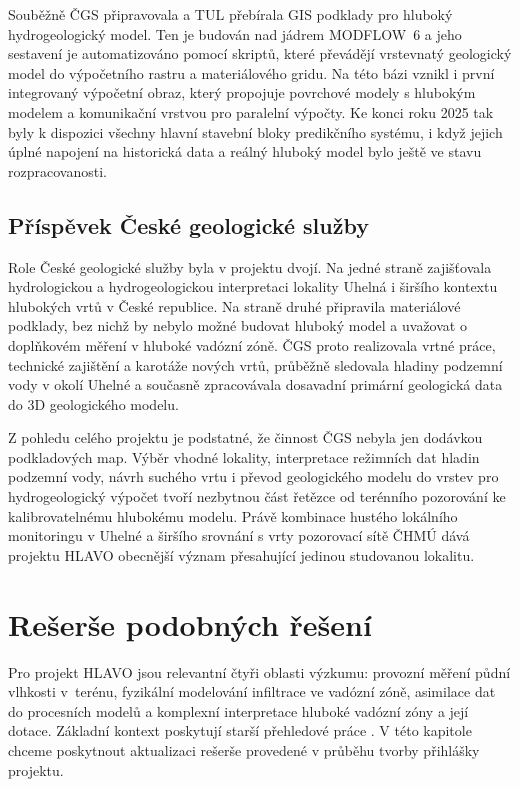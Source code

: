 \documentclass[11pt,a4paper]{article}
\begin{document}
\begin{onehalfspacing}
Souběžně ČGS připravovala a TUL přebírala GIS podklady pro hluboký
hydrogeologický model. Ten je budován nad jádrem MODFLOW~6 a jeho sestavení je
automatizováno pomocí skriptů, které převádějí vrstevnatý geologický model do
výpočetního rastru a materiálového gridu. Na této bázi vznikl i první
integrovaný výpočetní obraz, který propojuje povrchové modely s hlubokým
modelem a komunikační vrstvou pro paralelní výpočty. Ke konci roku 2025 tak
byly k dispozici všechny hlavní stavební bloky predikčního systému, i když
jejich úplné napojení na historická data a reálný hluboký model bylo ještě ve
stavu rozpracovanosti.

\subsection{Příspěvek České geologické služby}
Role České geologické služby byla v projektu dvojí. Na jedné straně
zajišťovala hydrologickou a hydrogeologickou interpretaci lokality Uhelná i
širšího kontextu hlubokých vrtů v České republice. Na straně druhé připravila
materiálové podklady, bez nichž by nebylo možné budovat hluboký model a
uvažovat o doplňkovém měření v hluboké vadózní zóně. ČGS proto realizovala
vrtné práce, technické zajištění a karotáže nových vrtů, průběžně sledovala
hladiny podzemní vody v okolí Uhelné a současně zpracovávala dosavadní
primární geologická data do 3D geologického modelu.

Z pohledu celého projektu je podstatné, že činnost ČGS nebyla jen dodávkou
podkladových map. Výběr vhodné lokality, interpretace režimních dat hladin
podzemní vody, návrh suchého vrtu i převod geologického modelu do vrstev pro
hydrogeologický výpočet tvoří nezbytnou část řetězce od terénního pozorování
ke kalibrovatelnému hlubokému modelu. Právě kombinace hustého lokálního
monitoringu v Uhelné a širšího srovnání s vrty pozorovací sítě ČHMÚ dává
projektu HLAVO obecnější význam přesahující jedinou studovanou lokalitu.


\section{Rešerše podobných řešení}
\label{sec:reserse}
Pro projekt HLAVO jsou relevantní čtyři oblasti výzkumu: provozní měření
půdní vlhkosti v~terénu, fyzikální modelování infiltrace ve vadózní zóně,
asimilace dat do procesních modelů a komplexní interpretace hluboké vadózní zóny a její dotace. Základní kontext poskytují starší přehledové práce \parencite{Lekshmi2014,Cerny2009,Farthing_Ogden_2017}. V této kapitole chceme poskytnout aktualizaci rešerše provedené v průběhu tvorby přihlášky projektu.


\end{onehalfspacing}
\end{document}
